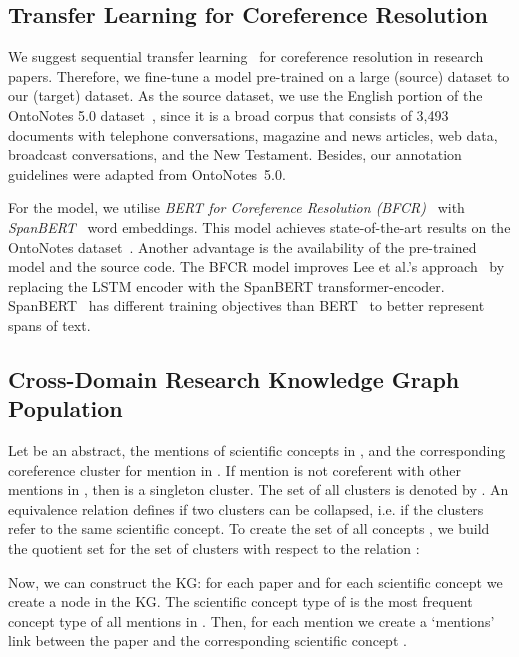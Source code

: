 \documentclass[runningheads]{llncs}
\begin{document}
\subsection{Transfer Learning for Coreference Resolution}

We suggest sequential transfer learning~\cite{Ruder2019Neural} for coreference resolution in research papers. Therefore, we fine-tune a model pre-trained on a large (source) dataset to our (target) dataset. 
As the source dataset, we use the English portion of the OntoNotes 5.0 dataset~\cite{Pradhan2013TowardsRL}, since it is a broad corpus that consists of 3,493 documents with telephone conversations, magazine and news articles, web data, broadcast conversations, and the New Testament. Besides, our annotation guidelines were adapted from OntoNotes~5.0.

For the model, we utilise \emph{BERT for Coreference Resolution (BFCR)}~\cite{Joshi2020BFCR} with \emph{SpanBERT}~\cite{Joshi2020SpanBERT} word embeddings. This model achieves state-of-the-art results on the Onto\-Notes dataset~\cite{Joshi2020SpanBERT}. Another advantage is the availability of the pre-trained model and the source code.
The BFCR model improves Lee et al.'s approach~\cite{LeeHZ18Coreference} by replacing the LSTM encoder with the SpanBERT transformer-encoder. SpanBERT~\cite{Joshi2020SpanBERT} has different training objectives than BERT~\cite{Devlin2018BERTPO} to better represent spans of text.


\subsection{Cross-Domain Research Knowledge Graph Population}
\label{sec:kg_construction_approach}

Let  be an abstract,  the mentions of scientific concepts in , and  the corresponding coreference cluster for mention  in . If mention  is not coreferent with other mentions in , then  is a singleton cluster. The set of all clusters is denoted by .
An equivalence relation  defines if two clusters can be collapsed, i.e. if the clusters refer to the same scientific concept. 
To create the set of all concepts , we build the quotient set for the set of clusters  with respect to the relation :

Now, we can construct the KG:
for each paper  and for each scientific concept  we create a node in the KG.
The scientific concept type of  is the most frequent concept type of all mentions in .
Then, for each mention  we create a `mentions' link between the paper and the corresponding scientific concept .
\end{document}
